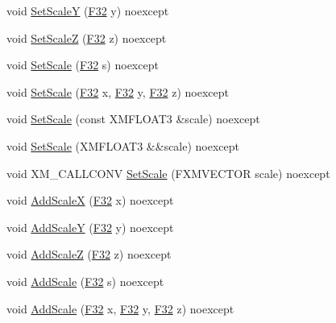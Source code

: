 \begin{DoxyCompactItemize}
\item 
void \hyperlink{structmage_1_1_transform_a953a89b7f7ed2ec47eb05074d43e35c6}{Set\+ScaleY} (\hyperlink{namespacemage_aa97e833b45f06d60a0a9c4fc22ae02c0}{F32} y) noexcept
\item 
void \hyperlink{structmage_1_1_transform_aa8fa7169c739cd1e005bbb373ccbf6c3}{Set\+ScaleZ} (\hyperlink{namespacemage_aa97e833b45f06d60a0a9c4fc22ae02c0}{F32} z) noexcept
\item 
void \hyperlink{structmage_1_1_transform_acf366489ae37e771e3f7b06c6452cb33}{Set\+Scale} (\hyperlink{namespacemage_aa97e833b45f06d60a0a9c4fc22ae02c0}{F32} s) noexcept
\item 
void \hyperlink{structmage_1_1_transform_a0a2d5430c745a27c5acaff472ba8b82e}{Set\+Scale} (\hyperlink{namespacemage_aa97e833b45f06d60a0a9c4fc22ae02c0}{F32} x, \hyperlink{namespacemage_aa97e833b45f06d60a0a9c4fc22ae02c0}{F32} y, \hyperlink{namespacemage_aa97e833b45f06d60a0a9c4fc22ae02c0}{F32} z) noexcept
\item 
void \hyperlink{structmage_1_1_transform_a815185ca44ff5d0d385ff919ee355e33}{Set\+Scale} (const X\+M\+F\+L\+O\+A\+T3 \&scale) noexcept
\item 
void \hyperlink{structmage_1_1_transform_a06ec78f9239c0f0663638359f4f3c3b8}{Set\+Scale} (X\+M\+F\+L\+O\+A\+T3 \&\&scale) noexcept
\item 
void X\+M\+\_\+\+C\+A\+L\+L\+C\+O\+NV \hyperlink{structmage_1_1_transform_a7dd2ca0ee43f956f1a6db79f83c14983}{Set\+Scale} (F\+X\+M\+V\+E\+C\+T\+OR scale) noexcept
\item 
void \hyperlink{structmage_1_1_transform_ae2f2f2109aca3c2c34ea1601d392e6a4}{Add\+ScaleX} (\hyperlink{namespacemage_aa97e833b45f06d60a0a9c4fc22ae02c0}{F32} x) noexcept
\item 
void \hyperlink{structmage_1_1_transform_a6f3dbff67c49f2d920c25d46cf25d0ee}{Add\+ScaleY} (\hyperlink{namespacemage_aa97e833b45f06d60a0a9c4fc22ae02c0}{F32} y) noexcept
\item 
void \hyperlink{structmage_1_1_transform_ae9aa81d2f6af6422a261878b63a0e5de}{Add\+ScaleZ} (\hyperlink{namespacemage_aa97e833b45f06d60a0a9c4fc22ae02c0}{F32} z) noexcept
\item 
void \hyperlink{structmage_1_1_transform_a3b90baf1db39dd3dc17a9203b4383073}{Add\+Scale} (\hyperlink{namespacemage_aa97e833b45f06d60a0a9c4fc22ae02c0}{F32} s) noexcept
\item 
void \hyperlink{structmage_1_1_transform_a9159be1589e53e93d50cf3dad60e7f75}{Add\+Scale} (\hyperlink{namespacemage_aa97e833b45f06d60a0a9c4fc22ae02c0}{F32} x, \hyperlink{namespacemage_aa97e833b45f06d60a0a9c4fc22ae02c0}{F32} y, \hyperlink{namespacemage_aa97e833b45f06d60a0a9c4fc22ae02c0}{F32} z) noexcept

\end{DoxyCompactItemize}
